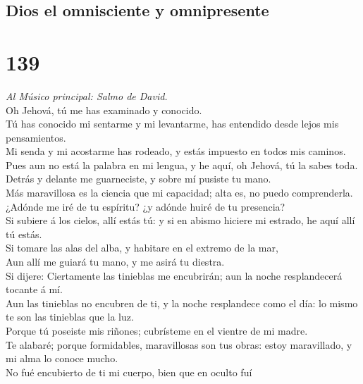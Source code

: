 \hypertarget{dios-el-omnisciente-y-omnipresente}{%
\subsection{Dios el omnisciente y
omnipresente}\label{dios-el-omnisciente-y-omnipresente}}

\hypertarget{section-138}{%
\section{139}\label{section-138}}

 \emph{Al Músico principal: Salmo de David.}\\
Oh Jehová, tú me has examinado y conocido.\\
 Tú has conocido mi sentarme y mi levantarme, has entendido
desde lejos mis pensamientos.\\
 Mi senda y mi acostarme has rodeado, y estás impuesto en
todos mis caminos.\\
 Pues aun no está la palabra en mi lengua, y he aquí, oh
Jehová, tú la sabes toda.\\
 Detrás y delante me guarneciste, y sobre mí pusiste tu
mano.\\
 Más maravillosa es la ciencia que mi capacidad; alta es, no
puedo comprenderla.\\
 ¿Adónde me iré de tu espíritu? ¿y adónde huiré de tu
presencia?\\
 Si subiere á los cielos, allí estás tú: y si en abismo
hiciere mi estrado, he aquí allí tú estás.\\
 Si tomare las alas del alba, y habitare en el extremo de la
mar,\\
 Aun allí me guiará tu mano, y me asirá tu diestra.\\
 Si dijere: Ciertamente las tinieblas me encubrirán; aun la
noche resplandecerá tocante á mí.\\
 Aun las tinieblas no encubren de ti, y la noche
resplandece como el día: lo mismo te son las tinieblas que la luz.\\
 Porque tú poseiste mis riñones; cubrísteme en el vientre
de mi madre.\\
 Te alabaré; porque formidables, maravillosas son tus
obras: estoy maravillado, y mi alma lo conoce mucho.\\
 No fué encubierto de ti mi cuerpo, bien que en oculto fuí
